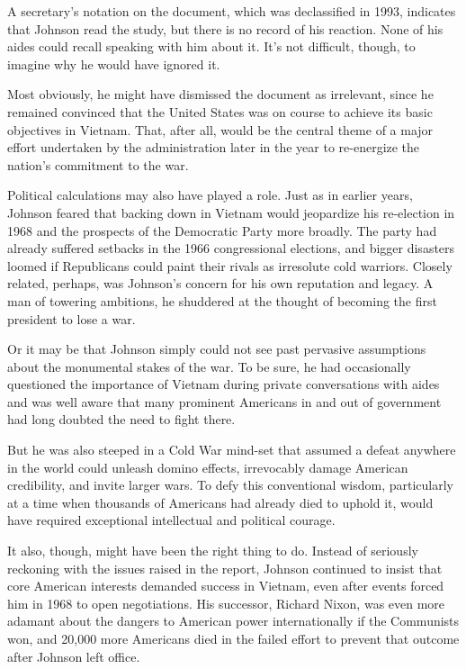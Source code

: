A secretary's notation on the document, which was declassified in 1993,
indicates that Johnson read the study, but there is no record of his
reaction. None of his aides could recall speaking with him about it.
It's not difficult, though, to imagine why he would have ignored it.

Most obviously, he might have dismissed the document as irrelevant,
since he remained convinced that the United States was on course to
achieve its basic objectives in Vietnam. That, after all, would be the
central theme of a major effort undertaken by the administration later
in the year to re-energize the nation's commitment to the war.

Political calculations may also have played a role. Just as in earlier
years, Johnson feared that backing down in Vietnam would jeopardize his
re-election in 1968 and the prospects of the Democratic Party more
broadly. The party had already suffered setbacks in the 1966
congressional elections, and bigger disasters loomed if Republicans
could paint their rivals as irresolute cold warriors. Closely related,
perhaps, was Johnson's concern for his own reputation and legacy. A man
of towering ambitions, he shuddered at the thought of becoming the first
president to lose a war.

Or it may be that Johnson simply could not see past pervasive
assumptions about the monumental stakes of the war. To be sure, he had
occasionally questioned the importance of Vietnam during private
conversations with aides and was well aware that many prominent
Americans in and out of government had long doubted the need to fight
there.

But he was also steeped in a Cold War mind-set that assumed a defeat
anywhere in the world could unleash domino effects, irrevocably damage
American credibility, and invite larger wars. To defy this conventional
wisdom, particularly at a time when thousands of Americans had already
died to uphold it, would have required exceptional intellectual and
political courage.

It also, though, might have been the right thing to do. Instead of
seriously reckoning with the issues raised in the report, Johnson
continued to insist that core American interests demanded success in
Vietnam, even after events forced him in 1968 to open negotiations. His
successor, Richard Nixon, was even more adamant about the dangers to
American power internationally if the Communists won, and 20,000 more
Americans died in the failed effort to prevent that outcome after
Johnson left office.

